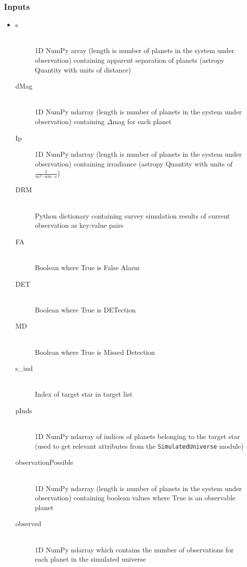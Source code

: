 \documentclass[cleanfoot]{asme2ej}
\begin{document}
\subsubsection*{Inputs}
\begin{itemize}
    \item 
    \begin{description}
        \item[s] \hfill \\
        1D NumPy array (length is number of planets in the system under observation) containing apparent separation of planets (astropy Quantity with units of distance)
        \item[dMag] \hfill \\
        1D NumPy ndarray (length is number of planets in the system under observation) containing $ \Delta $mag for each planet
        \item[Ip] \hfill
        1D NumPy ndarray (length is number of planets in the system under observation) containing irradiance (astropy Quantity with units of $ \frac{1}{m^2 \cdot nm \cdot s} $)
        \item[DRM] \hfill \\
        Python dictionary containing survey simulation results of current observation as key:value pairs
        \item[FA] \hfill \\
        Boolean where True is False Alarm
        \item[DET] \hfill \\
        Boolean where True is DETection
        \item[MD] \hfill \\
        Boolean where True is Missed Detection
        \item[s\_ind] \hfill \\
        Index of target star in target list
        \item[pInds] \hfill \\
        1D NumPy ndarray of indices of planets belonging to the target star (used to get relevant attributes from the \verb+SimulatedUniverse+ module)
        \item[observationPossible] \hfill \\
        1D NumPy ndarray (length is number of planets in the system under observation) containing boolean values where True is an observable planet
        \item[observed] \hfill \\
        1D NumPy ndarray which contains the number of observations for each planet in the simulated universe
    \end{description}
\end{itemize}
\end{document}
